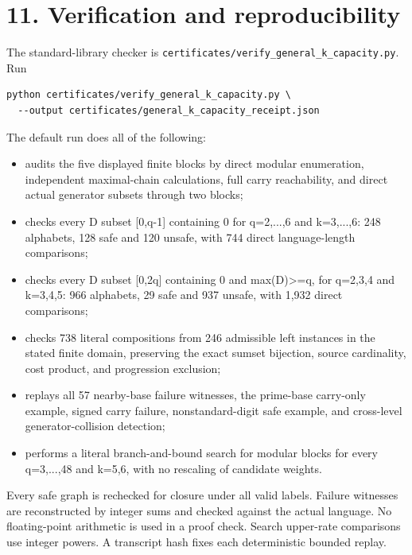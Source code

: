 \section{11. Verification and reproducibility}\label{n02-verification-and-reproducibility}

The standard-library checker is \nolinkurl{certificates/verify_general_k_capacity.py}. Run

\begin{Verbatim}[breaklines=true,breakanywhere=true,fontsize=\footnotesize]
python certificates/verify_general_k_capacity.py \
  --output certificates/general_k_capacity_receipt.json
\end{Verbatim}

The default run does all of the following:

\begin{itemize}
\tightlist
\item
  audits the five displayed finite blocks by direct modular enumeration, independent maximal-chain calculations, full carry reachability, and direct actual generator subsets through two blocks;
\item
  checks every D subset {[}0,q-1{]} containing 0 for q=2,...,6 and k=3,...,6: 248 alphabets, 128 safe and 120 unsafe, with 744 direct language-length comparisons;
\item
  checks every D subset {[}0,2q{]} containing 0 and max(D)\textgreater=q, for q=2,3,4 and k=3,4,5: 966 alphabets, 29 safe and 937 unsafe, with 1,932 direct comparisons;
\item
  checks 738 literal compositions from 246 admissible left instances in the stated finite domain, preserving the exact sumset bijection, source cardinality, cost product, and progression exclusion;
\item
  replays all 57 nearby-base failure witnesses, the prime-base carry-only example, signed carry failure, nonstandard-digit safe example, and cross-level generator-collision detection;
\item
  performs a literal branch-and-bound search for modular blocks for every q=3,...,48 and k=5,6, with no rescaling of candidate weights.
\end{itemize}

Every safe graph is rechecked for closure under all valid labels. Failure witnesses are reconstructed by integer sums and checked against the actual language. No floating-point arithmetic is used in a proof check. Search upper-rate comparisons use integer powers. A transcript hash fixes each deterministic bounded replay.

